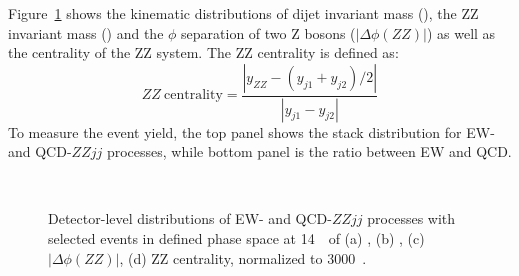 Figure~\ref{fig:kine} shows the kinematic distributions of dijet invariant mass (\mjj), the ZZ invariant mass (\mzz) and 
the $\phi$ separation of two Z bosons ($|\Delta\phi(ZZ)|$) as well as the centrality of the ZZ system.
The ZZ centrality is defined as:
\begin{equation}
  ZZ~\text{centrality} = \frac{|y_{ZZ} - (y_{j1} + y_{j2})/2|}{|y_{j1} - y_{j2}|}
\end{equation}
To measure the event yield, the top panel shows the stack distribution for EW- and QCD-$ZZjj$ processes,
while bottom panel is the ratio between EW and QCD.
\begin{figure}[!htbp]
\centering
{}
\\
\caption{
Detector-level distributions of EW- and QCD-$ZZjj$ processes with selected events in defined phase space at 14~\tev~of 
(a) \mjj,
(b) \mzz,
(c) $|\Delta\phi(ZZ)|$,
(d) ZZ centrality,
normalized to 3000~\ifb{}.
}
\label{fig:kine}
\end{figure}


